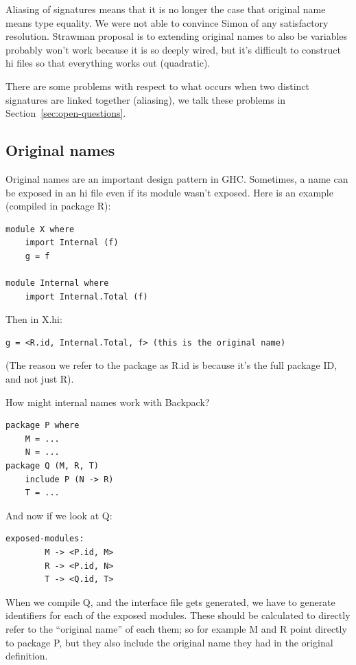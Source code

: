 \documentclass{article}
\begin{document}
Aliasing of signatures means that it is no longer the case that
original name means type equality.  We were not able to convince
Simon of any satisfactory resolution.  Strawman proposal is to
extending original names to also be variables probably won't work
because it is so deeply wired, but it's difficult to construct hi
files so that everything works out (quadratic).


There are some problems with respect to what occurs when two
distinct signatures are linked together (aliasing), we talk these problems in
Section~\ref{sec:open-questions}.

\fi

\subsection{Original names} Original names are an important design pattern
in GHC\@.
Sometimes, a name can be exposed in an hi file even if its module
wasn't exposed. Here is an example (compiled in package R):

\begin{verbatim}
module X where
    import Internal (f)
    g = f

module Internal where
    import Internal.Total (f)
\end{verbatim}

Then in X.hi:

\begin{verbatim}
g = <R.id, Internal.Total, f> (this is the original name)
\end{verbatim}

(The reason we refer to the package as R.id is because it's the
full package ID, and not just R).

How might internal names work with Backpack?

\begin{verbatim}
package P where
    M = ...
    N = ...
package Q (M, R, T)
    include P (N -> R)
    T = ...
\end{verbatim}

And now if we look at Q\@:

\begin{verbatim}
exposed-modules:
        M -> <P.id, M>
        R -> <P.id, N>
        T -> <Q.id, T>
\end{verbatim}

When we compile Q, and the interface file gets generated, we have
to generate identifiers for each of the exposed modules.  These should
be calculated to directly refer to the ``original name'' of each them;
so for example M and R point directly to package P, but they also
include the original name they had in the original definition.
\end{document}
